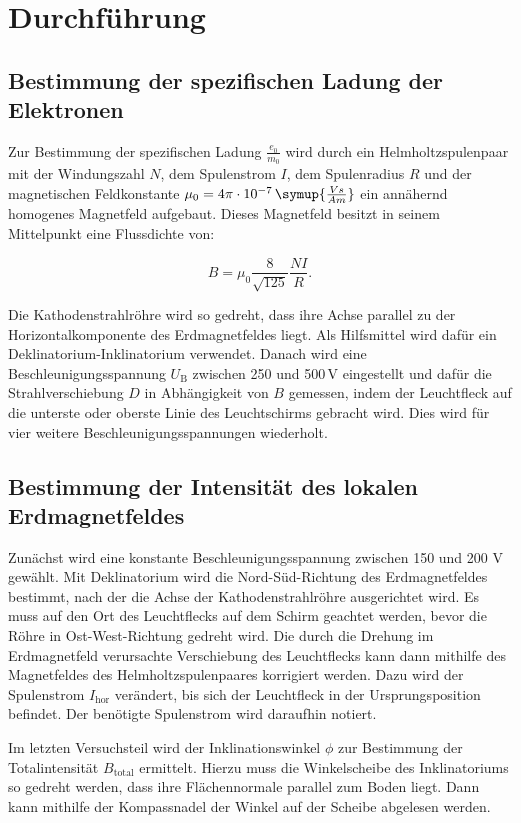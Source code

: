 \section{Durchführung}
\label{sec:Durchführung}

\subsection{Bestimmung der spezifischen Ladung der Elektronen}

Zur Bestimmung der spezifischen Ladung $\frac{e_0}{m_0}$ wird durch ein Helmholtzspulenpaar mit der Windungszahl $N$, dem Spulenstrom $I$, dem Spulenradius $R$ und der magnetischen Feldkonstante $\mu_0 = 4\pi \cdot 10^{-7}\,\symup{\frac{V s}{A m}}$ ein annähernd homogenes Magnetfeld aufgebaut. Dieses Magnetfeld besitzt in seinem Mittelpunkt eine Flussdichte von:

\begin{equation}
\label{eqn:magfeld}
B = \mu_0 \frac{8}{\sqrt{125}} \frac{N I}{R}.
\end{equation}

Die Kathodenstrahlröhre wird so gedreht, dass ihre Achse parallel zu der Horizontalkomponente des Erdmagnetfeldes liegt. Als Hilfsmittel wird dafür ein Deklinatorium-Inklinatorium verwendet. Danach wird eine
Beschleunigungsspannung $U_{\text{B}}$ zwischen 250 und 500\,V eingestellt und dafür die Strahlverschiebung $D$ in Abhängigkeit von $B$ gemessen, indem der Leuchtfleck auf die unterste oder oberste Linie 
des Leuchtschirms gebracht wird. Dies wird für vier weitere Beschleunigungsspannungen wiederholt.

\subsection{Bestimmung der Intensität des lokalen Erdmagnetfeldes}

Zunächst wird eine konstante Beschleunigungsspannung zwischen 150 und 200 V gewählt. Mit Deklinatorium wird die Nord-Süd-Richtung des Erdmagnetfeldes bestimmt, nach der die Achse der Kathodenstrahlröhre 
ausgerichtet wird. Es muss auf den Ort des Leuchtflecks auf dem Schirm geachtet werden, bevor die Röhre in Ost-West-Richtung gedreht wird. Die durch die Drehung im Erdmagnetfeld verursachte Verschiebung des 
Leuchtflecks kann dann mithilfe des Magnetfeldes des Helmholtzspulenpaares korrigiert werden. Dazu wird der Spulenstrom $I_{\text{hor}}$ verändert, bis sich der Leuchtfleck in der Ursprungsposition befindet. 
Der benötigte Spulenstrom wird daraufhin notiert.

Im letzten Versuchsteil wird der Inklinationswinkel $\phi$ zur Bestimmung der Totalintensität $B_{\text{total}}$ ermittelt. Hierzu muss die Winkelscheibe des Inklinatoriums so gedreht werden, dass ihre Flächennormale
parallel zum Boden liegt. Dann kann mithilfe der Kompassnadel der Winkel auf der Scheibe abgelesen werden.